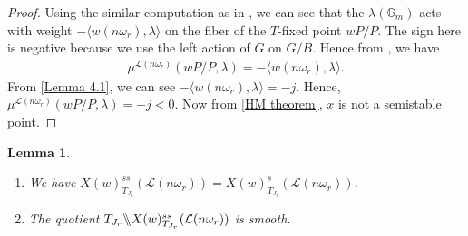 \documentclass[12pt,reqno]{amsart}
\numberwithin{equation}{section}
\newtheorem{lemma}[theorem]{Lemma}
\theoremstyle{definition}
\newcommand{\GmodX}[3]{#1 \backslash\mkern-6mu\backslash #2^{ss}_{#1}(#3)}
\begin{document}
\begin{proof}
Using the similar computation as in \cite[Lemma 5.1]{Ses2}, we can see that the $\lambda(\mathbb{G}_{m})$ acts with weight $-\langle w(n\omega_{r}),\lambda\rangle$ on the fiber of the $T$-fixed point $wP/P$. The sign here is negative because we use the left action of $G$ on $G/B$. Hence from \cite[Definition 2.2]{Ses2}, we have \begin{align*}
	\mu^{\mathcal{L}(n\omega_{r})}(wP/P,\lambda)=-\langle w(n\omega_{r}),\lambda\rangle.
\end{align*}
From \cref{Lemma 4.1}, we can see $-\langle w(n\omega_{r}),\lambda\rangle=-j$. Hence, $\mu^{\mathcal{L}(n\omega_{r})}(wP/P,\lambda)=-j<0$. Now from \cref{HM theorem}, $x$ is not a semistable point.
\end{proof}
\begin{lemma}\label{semistability=stability}
\begin{enumerate}
		\item We have $X(w)^{ss}_{T_{J_{r}}}(\mathcal{L}(n\omega_{r}))=X(w)^{s}_{T_{J_{r}}}(\mathcal{L}(n\omega_{r}))$.
		\item  The quotient $\GmodX{T_{J_{r}}}{X(w)}{\mathcal{L}(n\omega_{r})}$ is smooth.
\end{enumerate}
\end{lemma}
\end{document}
